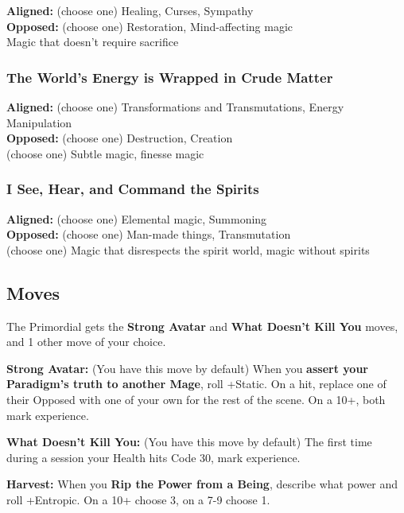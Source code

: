\documentclass[
  oneside,
  statementpaper,
  9pt]{memoir}
\begin{document}
\textbf{Aligned:} (choose one) Healing, Curses, Sympathy\\
\textbf{Opposed:} (choose one) Restoration, Mind-affecting magic\\
Magic that doesn't require sacrifice

\hypertarget{the-worlds-energy-is-wrapped-in-crude-matter}{%
\subsubsection{The World's Energy is Wrapped in Crude
Matter}\label{the-worlds-energy-is-wrapped-in-crude-matter}}

\textbf{Aligned:} (choose one) Transformations and Transmutations,
Energy Manipulation\\
\textbf{Opposed:} (choose one) Destruction, Creation\\
(choose one) Subtle magic, finesse magic

\hypertarget{i-see-hear-and-command-the-spirits}{%
\subsubsection{I See, Hear, and Command the
Spirits}\label{i-see-hear-and-command-the-spirits}}

\textbf{Aligned:} (choose one) Elemental magic, Summoning\\
\textbf{Opposed:} (choose one) Man-made things, Transmutation\\
(choose one) Magic that disrespects the spirit world, magic without
spirits

\hypertarget{moves-5}{%
\subsection{Moves}\label{moves-5}}

The Primordial gets the \textbf{Strong Avatar} and \textbf{What Doesn't
Kill You} moves, and 1 other move of your choice.

\textbf{Strong Avatar:} (You have this move by default) When you
\textbf{assert your Paradigm's truth to another Mage}, roll +Static. On
a hit, replace one of their Opposed with one of your own for the rest of
the scene. On a 10+, both mark experience.

\textbf{What Doesn't Kill You:} (You have this move by default) The
first time during a session your Health hits Code 30, mark experience.

\textbf{Harvest:} When you \textbf{Rip the Power from a Being}, describe
what power and roll +Entropic. On a 10+ choose 3, on a 7-9 choose 1.
\end{document}
